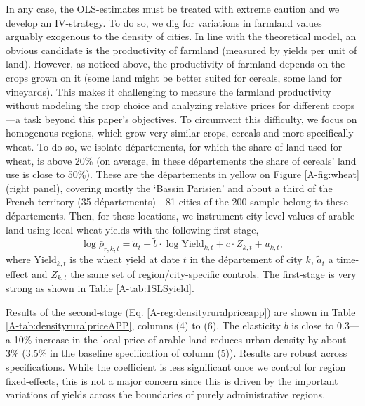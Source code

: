 \documentclass[11pt]{report}
\begin{document}
In any case, the OLS-estimates must be treated with extreme caution and we develop an IV-strategy. To do so, we dig for variations in farmland values arguably exogenous to the density of cities. In line with the theoretical model, an obvious candidate is the productivity of farmland (measured by yields per unit of land). However, as noticed above, the productivity of farmland depends on the crops grown on it (some land might be better suited for cereals, some land for vineyards). This makes it challenging to measure the farmland productivity without modeling the crop choice and analyzing relative prices for different crops---a task beyond this paper's objectives. To circumvent this difficulty, we focus on homogenous regions, which grow very similar crops, cereals and more specifically wheat. To do so, we isolate départements, for which the share of land used for wheat, is above 20\% (on average, in these départements the share of cereals' land use is close to 50\%). These are the départements in yellow on Figure \ref{A-fig:wheat} (right panel), covering mostly the `Bassin Parisien' and about a third of the French territory (35 départements)---81 cities of the 200 sample belong to these départements. Then, for these locations, we instrument city-level values of arable land using local wheat yields with the following first-stage,
\begin{equation}
\log \bar{\rho}_{r,k,t} = \tilde{a}_t + \tilde{b} \cdot \log \text{Yield}_{k,t}+ \tilde{c} \cdot Z_{k,t} + u_{k,t},
\label{A-reg:firststageyield}
\end{equation}
where $\text{Yield}_{k,t}$ is the wheat yield at date $t$ in the département of city $k$, $\tilde{a}_t$ a time-effect and $Z_{k,t}$ the same set of region/city-specific controls. The first-stage is very strong as shown in Table \ref{A-tab:1SLSyield}. 

Results of the second-stage (Eq. \ref{A-reg:densityruralpriceapp}) are shown in Table \ref{A-tab:densityruralpriceAPP}, columns (4) to (6). The elasticity $b$ is close to 0.3---a 10\% increase in the local price of arable land reduces urban density by about 3\% (3.5\% in the baseline specification of column (5)). Results are robust across specifications. While the coefficient is less significant once we control for region fixed-effects, this is not a major concern since this is driven by the important variations of yields across the boundaries of purely administrative regions.
\end{document}
